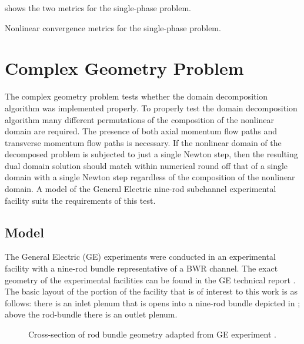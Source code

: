  shows the two metrics for the single-phase problem.

\begin{table}[h!tb]
\centering
\singlespace

\caption{Nonlinear convergence metrics for the single-phase problem.}
\label{tab:singleMetric}
\end{table}

\section{Complex Geometry Problem}
\label{sect:complexProblem}
The complex geometry problem tests whether the domain decomposition algorithm was implemented properly.
To properly test the domain decomposition algorithm many different permutations of the composition of the nonlinear domain are required.
The presence of both axial momentum flow paths and transverse momentum flow paths is necessary.
If the nonlinear domain of the decomposed problem is subjected to just a single Newton step, then the resulting dual domain solution should match within numerical round off that of a single domain with a single Newton step regardless of the composition of the nonlinear domain.
A model of the General Electric nine-rod subchannel experimental facility \cite{Lahey1970} suits the requirements of this test.

\subsection{Model}
\label{sect:complexModel}

The General Electric (GE) experiments were conducted in an experimental facility with a nine-rod bundle representative of a BWR channel.
The exact geometry of the experimental facilities can be found in the GE technical report \cite{Lahey1970}.
The basic layout of the portion of the facility that is of interest to this work is as follows: there is an inlet plenum that is opens into a nine-rod bundle depicted in ; above the rod-bundle there is an outlet plenum.

\begin{figure}[h!tb]
\centering

\caption{Cross-section of rod bundle geometry adapted from GE experiment \cite{Lahey1970}.}
\label{fig:channel_layout}
\end{figure}

